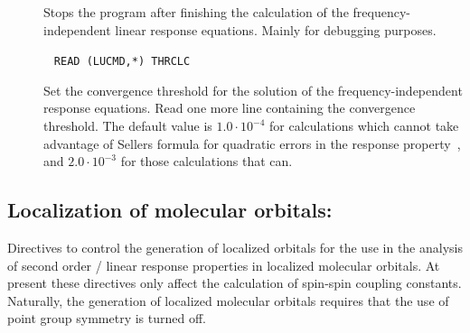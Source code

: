 \begin{description}
\item[] Stops the program after finishing the
calculation of the frequency-independent linear response equations. Mainly
for debugging purposes.

\item[]\verb| |\newline
\verb|READ (LUCMD,*) THRCLC|

Set the convergence threshold for the solution
of the frequency-independent response equations. Read one more line
containing the convergence threshold. The default value is
$1.0\cdot10^{-4}$ for calculations which cannot take advantage of Sellers
formula for quadratic errors in the response
property~\cite{hsijqc30}, and $2.0\cdot10^{-3}$ for those calculations
that can.
\end{description}

\subsection{Localization of molecular orbitals: }\label{sec:locali}

Directives to control the generation of localized orbitals for the use
in the analysis of second order / linear response properties in
localized molecular orbitals. At present these directives only affect
the calculation of spin-spin coupling constants. Naturally, the
generation of localized molecular orbitals requires that the use of
point group symmetry is turned off.

